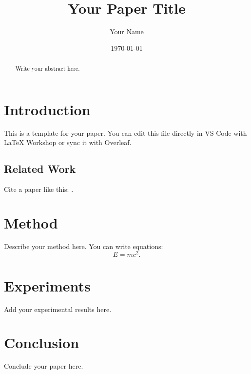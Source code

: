 \documentclass[11pt,a4paper]{article}
\title{\textbf{Your Paper Title}}
\author{Your Name}
\date{\today}
\theoremstyle{plain}
\theoremstyle{definition}
\begin{document}
\maketitle

\begin{abstract}
Write your abstract here.
\end{abstract}

\section{Introduction}
\label{sec:intro}

This is a template for your paper. You can edit this file directly in VS Code with LaTeX Workshop or sync it with Overleaf.

\subsection{Related Work}
\label{sec:related}

Cite a paper like this: \cite{example2024}.

\section{Method}
\label{sec:method}

Describe your method here. You can write equations:
\begin{equation}
    \label{eq:example}
    E = mc^2.
\end{equation}

\section{Experiments}
\label{sec:experiments}

Add your experimental results here.

\section{Conclusion}
\label{sec:conclusion}

Conclude your paper here.



\end{document}
